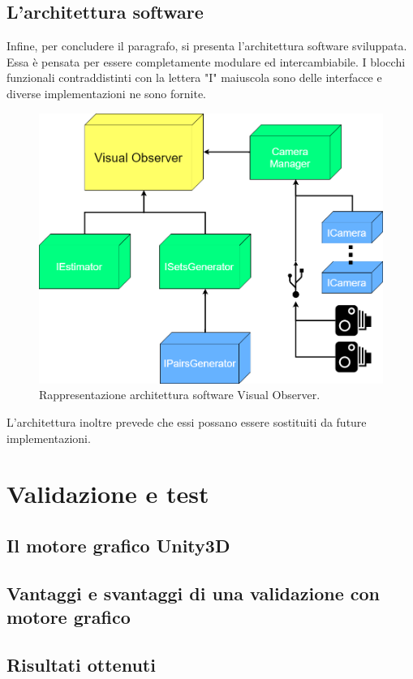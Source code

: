 \subsection{L'architettura software}
\label{sec:dev:arch}
Infine, per concludere il paragrafo, si presenta l'architettura software sviluppata. Essa è pensata per essere completamente modulare ed intercambiabile. I blocchi funzionali contraddistinti con la lettera "I" maiuscola sono delle interfacce e diverse implementazioni ne sono fornite.
\begin{figure}[h!]
	\centering
	\includegraphics[width=400pt]{imgs/arch.png}
	\caption{Rappresentazione architettura software Visual Observer.}
	\label{vis:impl:arch}
\end{figure} 

L'architettura inoltre prevede che essi possano essere sostituiti da future implementazioni. 

\section{Validazione e test}
\label{sec:test}

\subsection{Il motore grafico Unity3D}
\label{sec:unity}

\subsection{Vantaggi e svantaggi di una validazione con motore grafico}
\label{sec:valid}

\subsection{Risultati ottenuti}
\label{sec:perf}